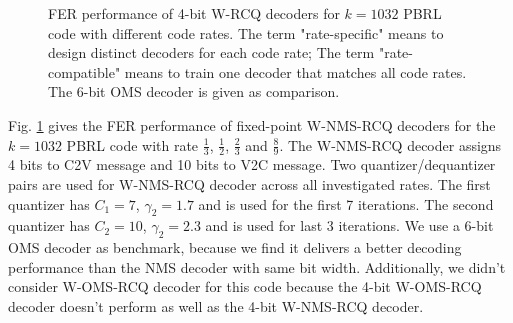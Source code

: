 \documentclass [PhD] {uclathes}
\begin{document}
\begin{figure}[t] 
    \centering
    \hfill
  \caption{FER performance of 4-bit W-RCQ decoders for $k=1032$ PBRL code with different code rates. The term "rate-specific" means to design distinct decoders for each code rate; The term "rate-compatible" means to train one decoder that matches all code rates. The 6-bit OMS decoder is given as comparison. }\label{fig: pbrl}
\end{figure}

Fig. \ref{fig: pbrl} gives the FER performance of fixed-point W-NMS-RCQ decoders for the $k=1032$ PBRL code with rate $\frac{1}{3}$, $\frac{1}{2}$, $\frac{2}{3}$ and $\frac{8}{9}$. The W-NMS-RCQ decoder assigns 4 bits to C2V message and 10 bits to V2C message. Two quantizer/dequantizer pairs are used for W-NMS-RCQ decoder across all investigated rates.
The first quantizer has $C_1=7$, $\gamma_2=1.7$ and is used for the first 7 iterations. The second quantizer has $C_2=10$, $\gamma_2=2.3$ and is used for last 3 iterations.
We use a 6-bit OMS decoder as benchmark, because we find it delivers a better decoding performance than the NMS decoder with same bit width.
Additionally, we didn't consider W-OMS-RCQ decoder for this code because the 4-bit W-OMS-RCQ decoder doesn't perform as well as the 4-bit W-NMS-RCQ decoder. 
\end{document}
